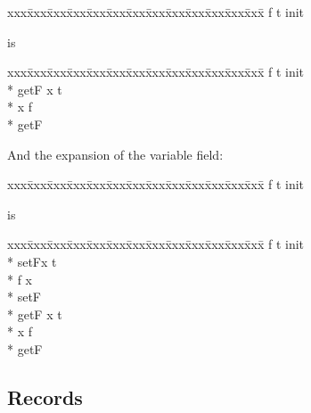 {\small\it\begin{minipage}{\textwidth}\begin{tabbing}
xxx\=xxx\=xxx\=xxx\=xxx\=xxx\=xxx\=xxx\=xxx\=xxx\=xxx\=xxx\=xxx\=\+\kill%
   f \CO{} t \assign{} init
\end{tabbing}\end{minipage}}

is

{\small\it\begin{minipage}{\textwidth}\begin{tabbing}
xxx\=xxx\=xxx\=xxx\=xxx\=xxx\=xxx\=xxx\=xxx\=xxx\=xxx\=xxx\=xxx\=\+\kill%
  f \CO{} t \assign{} init\\*{}%
  getF \returns{} \/\LB{}x \CO{} t\/\RB{}\+\\*{}%
  x \assign{} f\-\\*{}%
 getF
\end{tabbing}\end{minipage}}

And the expansion of the variable field:

{\small\it\begin{minipage}{\textwidth}\begin{tabbing}
xxx\=xxx\=xxx\=xxx\=xxx\=xxx\=xxx\=xxx\=xxx\=xxx\=xxx\=xxx\=xxx\=\+\kill%
  f \CO{} t \assign{} init
\end{tabbing}\end{minipage}}

is

{\small\it\begin{minipage}{\textwidth}\begin{tabbing}
xxx\=xxx\=xxx\=xxx\=xxx\=xxx\=xxx\=xxx\=xxx\=xxx\=xxx\=xxx\=xxx\=\+\kill%
  f \CO{} t \assign{} init\\*{}%
  setF\/\LB{}x \CO{} t\/\RB{}\+\\*{}%
  f \assign{} x\-\\*{}%
 setF\\*{}%
  getF \returns{} \/\LB{}x \CO{} t\/\RB{}\+\\*{}%
  x \assign{} f\-\\*{}%
 getF
\end{tabbing}\end{minipage}}

\subsection{Records}

